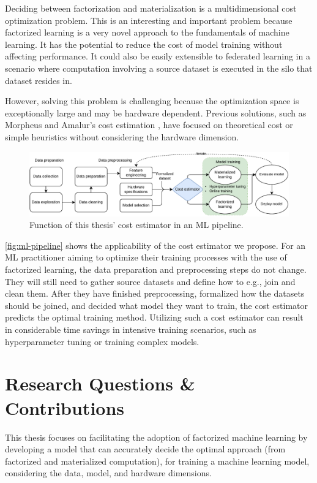 Deciding between factorization and materialization is a multidimensional cost optimization problem. This is an interesting and important problem because factorized learning is a very novel approach to the fundamentals of machine learning. It has the potential to reduce the cost of model training without affecting performance. It could also be easily extensible to federated learning in a scenario where computation involving a source dataset is executed in the silo that dataset resides in.

However, solving this problem is challenging because the optimization space is exceptionally large and may be hardware dependent. Previous solutions, such as Morpheus \cite{morpheus} and Amalur's cost estimation \cite{schijndel_cost_estimation}, have focused on theoretical cost or simple heuristics without considering the hardware dimension.

\begin{figure}[h]
    \centering
    \includegraphics[width=0.95\linewidth]{chapters/01_introduction/figures/ML-Pipeline.pdf}
    \caption{Function of this thesis' cost estimator in an ML pipeline.}
    \label{fig:ml-pipeline}
\end{figure}

\autoref{fig:ml-pipeline} shows the applicability of the cost estimator we propose. For an ML practitioner aiming to optimize their training processes with the use of factorized learning, the data preparation and preprocessing steps do not change. They will still need to gather source datasets and define how to e.g., join and clean them. After they have finished preprocessing, formalized how the datasets should be joined, and decided what model they want to train, the cost estimator predicts the optimal training method. Utilizing such a cost estimator can result in considerable time savings in intensive training scenarios, such as hyperparameter tuning or training complex models.


\section{Research Questions \& Contributions}
This thesis focuses on facilitating the adoption of factorized machine learning by developing a model that can accurately decide the optimal approach (from factorized and materialized computation), for training a machine learning model, considering the data, model, and hardware dimensions.

